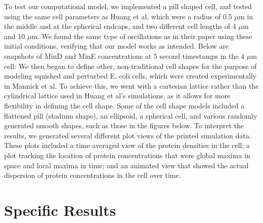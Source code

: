 \documentclass[letterpaper,twocolumn,amsmath,amssymb,pre]{revtex4-1}
\begin{document}
To test our computational model, we implemented a pill shaped cell, and
tested using the same cell parameters as Huang et al, which were a radius
of 0.5 $\mu$m in the middle and at the spherical endcaps, and two different
cell lengths of 4 $\mu$m and 10 $\mu$m. We found the same type of
oscillations as in their paper using these initial conditions, verifying
that our model works as intended. Below are snapshots of MinD and MinE
concentrations at 5 second timestamps in the 4 $\mu$m cell:
\newline
{}
\newline
\newline
We then began to define other, non-traditional cell shapes for the purpose of
modeling squished and perturbed E. coli cells, which were created
experimentally in Mannick et al. To achieve this, we went with a
cartesian lattice rather than the cylindrical lattice used in Huang et
al's simulations, as it allows for more flexibility in defining the
cell shape. Some of the cell shape models included a flattened pill
(stadium shape), an ellipsoid, a spherical cell, and various randomly
generated smooth shapes, such as those in the figures below.
\newline
{}
\newline
\newline
To interpret the results, we generated several different plot views of
the printed simulation data. These plots included a time averaged view
of the protein densities in the cell; a plot tracking the location of
protein concentrations that were global maxima in space and local maxima in
time; and an animated view that showed the actual dispersion of
protein concentrations in the cell over time.
\section{Specific Results}
\end{document}
